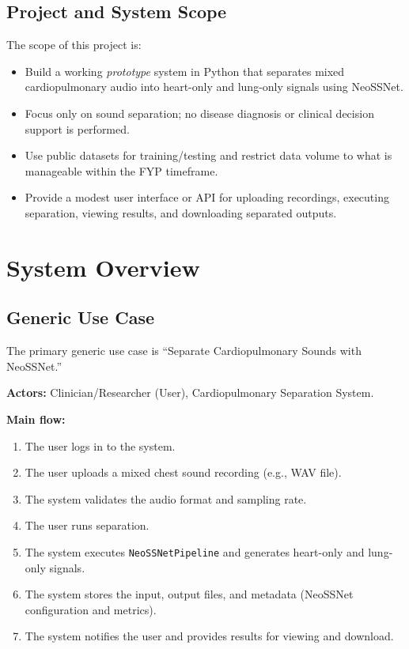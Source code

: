 \documentclass[12pt,a4paper]{report}
\begin{document}
\subsection{Project and System Scope}
The scope of this project is:
\begin{itemize}[nosep]
  \item Build a working \emph{prototype} system in Python that separates mixed cardiopulmonary audio into heart-only and lung-only signals using NeoSSNet.
  \item Focus only on sound separation; no disease diagnosis or clinical decision support is performed.
  \item Use public datasets for training/testing and restrict data volume to what is manageable within the FYP timeframe.
  \item Provide a modest user interface or API for uploading recordings, executing separation, viewing results, and downloading separated outputs.
\end{itemize}

\section{System Overview}

\subsection{Generic Use Case}
The primary generic use case is ``Separate Cardiopulmonary Sounds with NeoSSNet.''

\noindent\textbf{Actors:} Clinician/Researcher (User), Cardiopulmonary Separation System.

\noindent\textbf{Main flow:}
\begin{enumerate}[nosep]
  \item The user logs in to the system.
  \item The user uploads a mixed chest sound recording (e.g., WAV file).
  \item The system validates the audio format and sampling rate.
  \item The user runs separation.
  \item The system executes \texttt{NeoSSNetPipeline} and generates heart-only and lung-only signals.
  \item The system stores the input, output files, and metadata (NeoSSNet configuration and metrics).
  \item The system notifies the user and provides results for viewing and download.
\end{enumerate}
\end{document}
